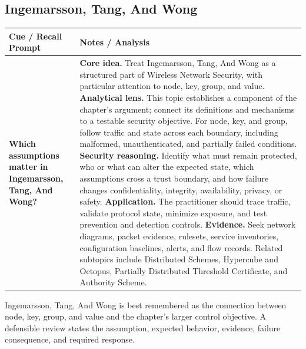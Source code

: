 \documentclass[11pt]{article}
\newcommand{\CornellHeader}{%
\rowcolor{Navy}\color{white}\bfseries Cue / Recall Prompt & \color{white}\bfseries Notes / Analysis\\\hline}
\newcommand{\CornellRow}[2]{%
\cellcolor{CueGray}\RaggedRight\textbf{#1} & \RaggedRight #2\\\hline}
\begin{document}
\subsection*{Ingemarsson, Tang, And Wong}
\begin{longtable}{>{\RaggedRight\arraybackslash}p{}|>{\RaggedRight\arraybackslash}p{}}
\CornellHeader
\CornellRow{Which assumptions matter in Ingemarsson, Tang, And Wong?}{\textbf{Core idea.} Treat Ingemarsson, Tang, And Wong as a structured part of Wireless Network Security, with particular attention to node, key, group, and value. \textbf{Analytical lens.} This topic establishes a component of the chapter's argument; connect its definitions and mechanisms to a testable security objective. For node, key, and group, follow traffic and state across each boundary, including malformed, unauthenticated, and partially failed conditions. \textbf{Security reasoning.} Identify what must remain protected, who or what can alter the expected state, which assumptions cross a trust boundary, and how failure changes confidentiality, integrity, availability, privacy, or safety. \textbf{Application.} The practitioner should trace traffic, validate protocol state, minimize exposure, and test prevention and detection controls. \textbf{Evidence.} Seek network diagrams, packet evidence, rulesets, service inventories, configuration baselines, alerts, and flow records. Related subtopics include Distributed Schemes, Hypercube and Octopus, Partially Distributed Threshold Certificate, and Authority Scheme.}
\end{longtable}
\begin{topicsummary}
Ingemarsson, Tang, And Wong is best remembered as the connection between node, key, group, and value and the chapter's larger control objective. A defensible review states the assumption, expected behavior, evidence, failure consequence, and required response.
\end{topicsummary}
\end{document}
